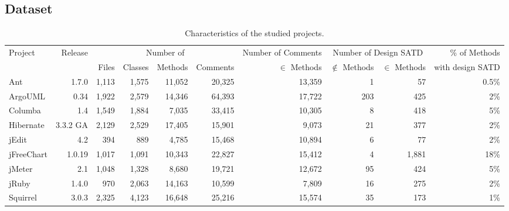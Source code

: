 \subsection{Dataset}


\begin{landscape}
\begin{table}[t]
	\caption{Characteristics of the studied projects.}
	\label{tab:projects}
	\centering
		\begin{adjustbox}{center}
			\begin{tabular}{l r | r r r r | r | r r | r}
				\hline
				\multirow{2}{*}{Project} & \multirow{2}{*}{Release} &\multicolumn{4}{c|}{Number of} &\multicolumn{1}{c|}{Number of Comments}
				&\multicolumn{2}{c|}{Number of Design SATD} & \% of Methods\\
				&& Files& Classes& Methods& Comments                      & $\in$ Methods& $\notin$ Methods & $\in$ Methods & with design SATD\\
				\hline
				Ant&1.7.0 & 1,113 & 1,575 & 11,052 & 20,325               & 13,359        &  1 & 57 & 0.5\% \\
				ArgoUML&0.34& 1,922 & 2,579 & 14,346 & 64,393       &  17,722       & 203 & 425  & 2\%\\
				Columba&1.4& 1,549 & 1,884 & 7,035 & 33,415           & 10,305        & 8 & 418 & 5\%  \\
				Hibernate&3.3.2 GA & 2,129 & 2,529 & 17,405 & 15,901 & 9,073        & 21  &  377  &  2\%\\
				jEdit & 4.2 & 394 & 889 & 4,785 & 15,468                     &10,894         & 6  & 77  & 2\% \\
				jFreeChart&1.0.19 & 1,017 & 1,091 & 10,343 & 22,827  & 15,412       &  4  & 1,881  & 18\%\\
				jMeter&2.1& 1,048 & 1,328 & 8,680 & 19,721                &  12,672      & 95 &  424 & 5\%  \\
				jRuby&1.4.0 & 970 & 2,063 & 14,163 & 10,599               & 7,809        & 16   & 275  &  2\%\\
				Squirrel&3.0.3 & 2,325 & 4,123 & 16,648 & 25,216         & 15,574      &35  & 173  & 1\%\\
				\hline
			\end{tabular}
		\end{adjustbox}
		\vspace{-4mm}
\end{table}
\end{landscape}

